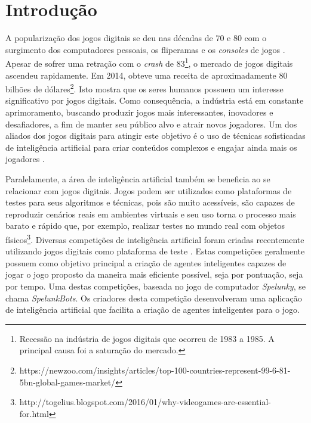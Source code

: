 \chapter{\label{chap:introduction}Introdução}


A popularização dos jogos digitais se deu nas décadas de 70 e 80 com o
surgimento dos computadores pessoais, os fliperamas e os \textit{consoles} de
jogos \cite{ultimate_history_video_games}. Apesar de sofrer uma retração com o
\textit{crash} de 83\footnote{Recessão na indústria de jogos digitais que
ocorreu de 1983 a 1985.  A principal causa foi a saturação do mercado.}, o
mercado de jogos digitais ascendeu rapidamente. Em 2014, obteve uma receita de
aproximadamente 80 bilhões de
dólares\footnote{https://newzoo.com/insights/articles/top-100-countries-represent-99-6-81-5bn-global-games-market/}.
Isto mostra que os seres humanos possuem um interesse significativo por jogos
digitais. Como consequência, a indústria está em constante aprimoramento,
buscando produzir jogos mais interessantes, inovadores e desafiadores, a fim de
manter seu público alvo e atrair novos jogadores. Um dos aliados dos jogos
digitais para atingir este objetivo é o uso de técnicas sofisticadas de
inteligência artificial para criar conteúdos complexos e engajar ainda mais os
jogadores \cite{PanoramaAIGames}.

Paralelamente, a área de inteligência artificial também se beneficia ao se
relacionar com jogos digitais. Jogos podem ser utilizados como plataformas de
testes para seus algoritmos e técnicas, pois são muito acessíveis, são capazes
de reproduzir cenários reais em ambientes virtuais e seu uso torna o processo
mais barato e rápido que, por exemplo, realizar testes no mundo real com objetos
físicos\footnote{http://togelius.blogspot.com/2016/01/why-videogames-are-essential-for.html}.
Diversas competições de inteligência artificial foram criadas recentemente
utilizando jogos digitais como plataforma de teste \cite{GameAiCompetition}.
Estas competições geralmente possuem como objetivo principal a criação de
agentes inteligentes capazes de jogar o jogo proposto da maneira mais eficiente
possível, seja por pontuação, seja por tempo. Uma destas competições, baseada no
jogo de computador \textit{Spelunky}, se chama \textit{SpelunkBots}. Os
criadores desta competição desenvolveram uma aplicação de inteligência
artificial que facilita a criação de agentes inteligentes para o jogo.

